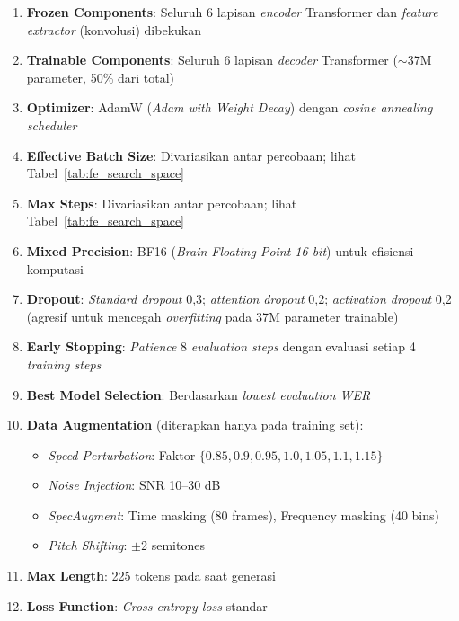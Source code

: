 \begin{enumerate}[noitemsep]
    \item \textbf{Frozen Components}: Seluruh 6 lapisan \textit{encoder} Transformer dan \textit{feature extractor} (konvolusi) dibekukan
    \item \textbf{Trainable Components}: Seluruh 6 lapisan \textit{decoder} Transformer ($\sim$37M parameter, 50\% dari total)
    \item \textbf{Optimizer}: AdamW (\textit{Adam with Weight Decay}) \cite{loshchilov2019adamw} dengan \textit{cosine annealing scheduler}
    \item \textbf{Effective Batch Size}: Divariasikan antar percobaan; lihat Tabel~\ref{tab:fe_search_space}
    \item \textbf{Max Steps}: Divariasikan antar percobaan; lihat Tabel~\ref{tab:fe_search_space}
    \item \textbf{Mixed Precision}: BF16 (\textit{Brain Floating Point 16-bit}) untuk efisiensi komputasi \cite{micikevicius2018mixed}
    \item \textbf{Dropout}: \textit{Standard dropout} 0,3; \textit{attention dropout} 0,2; \textit{activation dropout} 0,2 (agresif untuk mencegah \textit{overfitting} pada 37M parameter trainable) \cite{srivastava2014dropout}
    \item \textbf{Early Stopping}: \textit{Patience} 8 \textit{evaluation steps} dengan evaluasi setiap 4 \textit{training steps}
    \item \textbf{Best Model Selection}: Berdasarkan \textit{lowest evaluation WER}
    \item \textbf{Data Augmentation} (diterapkan hanya pada training set):
    \begin{itemize}[noitemsep]
        \item \textit{Speed Perturbation}: Faktor $\{0.85, 0.9, 0.95, 1.0, 1.05, 1.1, 1.15\}$
        \item \textit{Noise Injection}: SNR 10--30 dB
        \item \textit{SpecAugment}: Time masking (80 frames), Frequency masking (40 bins)
        \item \textit{Pitch Shifting}: $\pm$2 semitones
    \end{itemize}
    \item \textbf{Max Length}: 225 tokens pada saat generasi
    \item \textbf{Loss Function}: \textit{Cross-entropy loss} standar
\end{enumerate}

